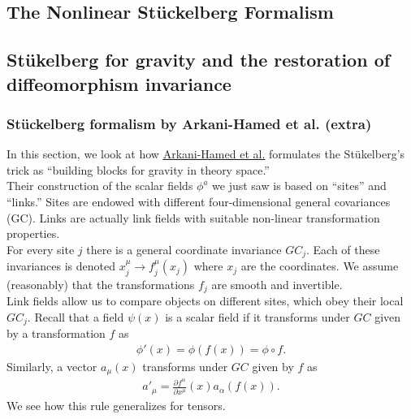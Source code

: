 \documentclass{book}
\theoremstyle{definition}
\newcommand{\p}{\partial}
\newcommand{\f}[2]{\frac{#1}{#2}}
\begin{document}
\newpage


\subsection{The Nonlinear St\"{u}ckelberg Formalism}




\subsection{St\"{u}kelberg for gravity and the restoration of diffeomorphism invariance}




\subsubsection{St\"{u}ckelberg formalism by Arkani-Hamed et al. (extra)}


In this section, we look at how \href{https://arxiv.org/pdf/hep-th/0210184.pdf}{\underline{Arkani-Hamed et al.}} formulates the St\"{u}kelberg's trick as ``building blocks for gravity in theory space.''\\

Their construction of the scalar fields $\phi^a$ we just saw is based on ``sites'' and ``links.'' Sites are endowed with different four-dimensional general covariances (GC). Links are actually link fields with suitable non-linear transformation properties. \\

For every site $j$ there is a general coordinate invariance $GC_j$. Each of these invariances is denoted $x^\mu_j \to f^\mu_j(x_j)$ where $x_j$ are the coordinates. We assume (reasonably) that the transformations $f_j$ are smooth and invertible.\\

Link fields allow us to compare objects on different sites, which obey their local $GC_j$. Recall that a field $\psi(x)$ is a scalar field if it transforms under $GC$ given by a transformation $f$ as
\begin{align}
\phi'(x) = \phi(f(x)) = \phi \circ f.
\end{align}
Similarly, a vector $a_\mu(x)$ transforms under $GC$ given by $f$ as
\begin{align}
a'_\mu = \f{\p f^\alpha}{\p x^\mu}(x)a_\alpha(f(x)).
\end{align}
We see how this rule generalizes for tensors. \\
\end{document}
